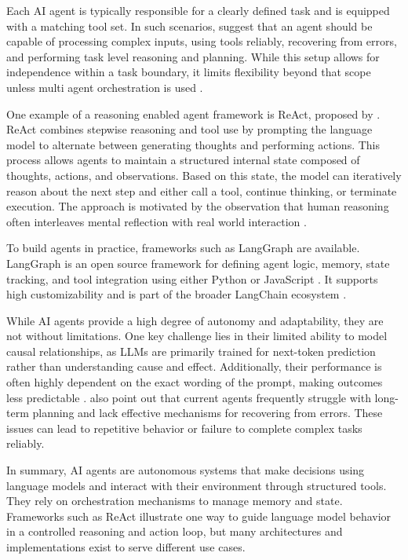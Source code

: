 \documentclass[a4paper,oneside,bibliography=totoc]{scrbook}
\begin{document}
Each \ac{AI} agent is typically responsible for a clearly defined task and is equipped with a matching tool set. In such scenarios, \citet{Anthropic2024} suggest that an agent should be capable of processing complex inputs, using tools reliably, recovering from errors, and performing task level reasoning and planning. While this setup allows for independence within a task boundary, it limits flexibility beyond that scope unless multi agent orchestration is used \cite{Sapkota2025}.

One example of a reasoning enabled agent framework is ReAct, proposed by \citet{Yao2023}. ReAct combines stepwise reasoning and tool use by prompting the language model to alternate between generating thoughts and performing actions. This process allows agents to maintain a structured internal state composed of thoughts, actions, and observations. Based on this state, the model can iteratively reason about the next step and either call a tool, continue thinking, or terminate execution. The approach is motivated by the observation that human reasoning often interleaves mental reflection with real world interaction \cite{Yao2023}.

To build agents in practice, frameworks such as LangGraph are available. LangGraph is an open source framework for defining agent logic, memory, state tracking, and tool integration using either Python or JavaScript \cite{LangChain2025}. It supports high customizability and is part of the broader LangChain ecosystem \cite{LangChain2025a}.

While \ac{AI} agents provide a high degree of autonomy and adaptability, they are not without limitations. One key challenge lies in their limited ability to model causal relationships, as \acp{LLM} are primarily trained for next-token prediction rather than understanding cause and effect. Additionally, their performance is often highly dependent on the exact wording of the prompt, making outcomes less predictable \cite{Sapkota2025}. \citet{Sapkota2025} also point out that current agents frequently struggle with long-term planning and lack effective mechanisms for recovering from errors. These issues can lead to repetitive behavior or failure to complete complex tasks reliably.

In summary, \ac{AI} agents are autonomous systems that make decisions using language models and interact with their environment through structured tools. They rely on orchestration mechanisms to manage memory and state. Frameworks such as ReAct illustrate one way to guide language model behavior in a controlled reasoning and action loop, but many architectures and implementations exist to serve different use cases.
\end{document}
